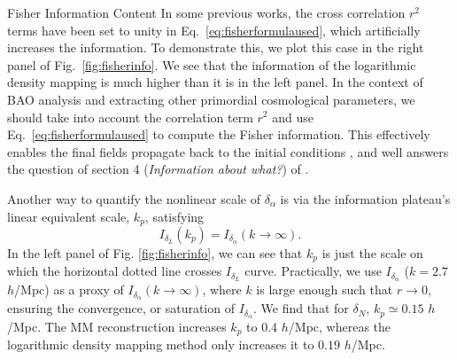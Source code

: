 \begin{section}{Fisher Information Content}
  In some previous works, the cross correlation $r^2$ terms have been set
  to unity in Eq.~\ref{eq:fisherformulaused}, which artificially
  increases the information. To demonstrate this, we plot this case in the right panel of 
  Fig.~\ref{fig:fisherinfo}.  We see that the information of the logarithmic density
  mapping is much higher than it is in the left panel.
  In the context of BAO analysis and extracting other primordial cosmological
  parameters, we should take into account the correlation term $r^2$ and
  use Eq.~\ref{eq:fisherformulaused} to compute the Fisher information.
  This effectively enables the final fields propagate back to
  the initial conditions \citep{bib:HarnoisD2013}, and well
  answers the question of section 4
  ({\it Information about what?}) of \citet{bib:HarnoisD2013}.

  Another way to quantify the nonlinear scale of $\delta_\alpha$
  is via the information plateau's linear equivalent scale, $k_p$, satisfying
  \begin{equation}
      I_{\delta_L}(k_p)=I_{\delta_{\alpha}}(k\rightarrow\infty).
  \end{equation}
  In the left panel of Fig. \ref{fig:fisherinfo}, we can see that 
  $k_p$ is just the scale on which 
  the horizontal dotted line crosses $I_{\delta_{L}}$ curve.
  Practically, we use $I_{\delta_{\alpha}}$ ($k=2.7$ $h$/Mpc)
  as a proxy of $I_{\delta_{\alpha}}(k\rightarrow\infty)$,
  where $k$ is large enough such that $r\rightarrow 0$, ensuring
  the convergence, or saturation of $I_{\delta_{\alpha}}$.
  We find that
  for $\delta_N$, $k_p\simeq 0.15$ $h$/Mpc.
  The MM reconstruction increases $k_p$ to $0.4$ $h$/Mpc,
  whereas the logarithmic density mapping method only increases it to $0.19$ $h$/Mpc.


\end{section}
